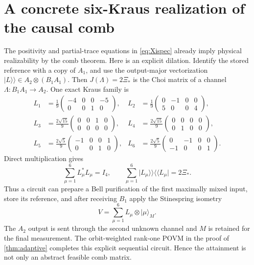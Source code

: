 \documentclass[11pt]{article}
\theoremstyle{definition}
\newcommand{\ket}[1]{\lvert #1\rangle}
\begin{document}
\section{A concrete six-Kraus realization of the causal comb}\label{app:kraus}

The positivity and partial-trace equations in \cref{eq:Xispec} already imply
physical realizability by the comb theorem.  Here is an explicit dilation.
Identify the stored reference with a copy of $A_1$, and use the output-major
vectorization $\lvert L\rangle\!\rangle\in A_2\otimes(B_1A_1)$.  Then
$J(\Lambda)=2\Xi_*$ is the Choi matrix of a channel
$\Lambda:B_1A_1\to A_2$.  One exact Kraus family is
\begin{align*}
L_1&=\frac19\begin{pmatrix}-4&0&0&-5\\0&0&1&0\end{pmatrix},&
L_2&=\frac19\begin{pmatrix}0&-1&0&0\\5&0&0&4\end{pmatrix},\\
L_3&=\frac{2\sqrt{15}}9\begin{pmatrix}0&0&1&0\\0&0&0&0\end{pmatrix},&
L_4&=\frac{2\sqrt{15}}9\begin{pmatrix}0&0&0&0\\0&1&0&0\end{pmatrix},\\
L_5&=\frac{2\sqrt5}9\begin{pmatrix}-1&0&0&1\\0&0&1&0\end{pmatrix},&
L_6&=\frac{2\sqrt5}9\begin{pmatrix}0&-1&0&0\\-1&0&0&1\end{pmatrix}.
\end{align*}
Direct multiplication gives
\[
 \sum_{\mu=1}^6L_\mu^*L_\mu=I_4,
 \qquad
 \sum_{\mu=1}^6\lvert L_\mu\rangle\!\rangle
 \langle\!\langle L_\mu\rvert=2\Xi_*.
\]
Thus a circuit can prepare a Bell purification of the first maximally mixed
input, store its reference, and after receiving $B_1$ apply the Stinespring
isometry
\[
 V=\sum_{\mu=1}^6L_\mu\otimes\ket{\mu}_M.
\]
The $A_2$ output is sent through the second unknown channel and $M$ is retained
for the final measurement.  The orbit-weighted rank-one POVM in the proof of
\cref{thm:adaptive} completes this explicit sequential circuit.  Hence the
attainment is not only an abstract feasible comb matrix.
\end{document}
